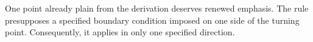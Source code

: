 One point already plain from the derivation deserves renewed emphasis. The rule presupposes a specified boundary condition imposed on one side of the turning point. Consequently, it applies in only one specified direction.

